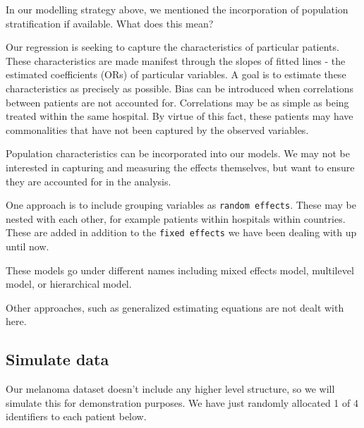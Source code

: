\documentclass[
  12pt,
  krantz2]{krantz}
\begin{document}

In our modelling strategy above, we mentioned the incorporation of population stratification if available.
What does this mean?

Our regression is seeking to capture the characteristics of particular patients.
These characteristics are made manifest through the slopes of fitted lines - the estimated coefficients (ORs) of particular variables.
A goal is to estimate these characteristics as precisely as possible.
Bias can be introduced when correlations between patients are not accounted for.
Correlations may be as simple as being treated within the same hospital.
By virtue of this fact, these patients may have commonalities that have not been captured by the observed variables.

Population characteristics can be incorporated into our models.
We may not be interested in capturing and measuring the effects themselves, but want to ensure they are accounted for in the analysis.

One approach is to include grouping variables as \texttt{random\ effects}.
These may be nested with each other, for example patients within hospitals within countries.
These are added in addition to the \texttt{fixed\ effects} we have been dealing with up until now.

These models go under different names including mixed effects model, multilevel model, or hierarchical model.

Other approaches, such as generalized estimating equations are not dealt with here.

\hypertarget{simulate-data}{%
\subsection{Simulate data}\label{simulate-data}}

Our melanoma dataset doesn't include any higher level structure, so we will simulate this for demonstration purposes.
We have just randomly allocated 1 of 4 identifiers to each patient below.
\end{document}
